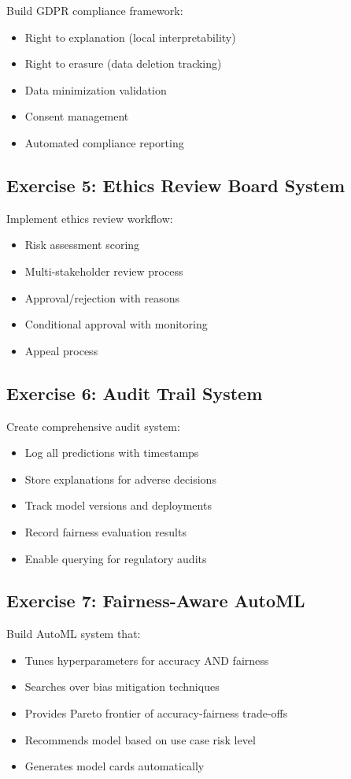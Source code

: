 Build GDPR compliance framework:
\begin{itemize}
    \item Right to explanation (local interpretability)
    \item Right to erasure (data deletion tracking)
    \item Data minimization validation
    \item Consent management
    \item Automated compliance reporting
\end{itemize}

\subsection{Exercise 5: Ethics Review Board System}

Implement ethics review workflow:
\begin{itemize}
    \item Risk assessment scoring
    \item Multi-stakeholder review process
    \item Approval/rejection with reasons
    \item Conditional approval with monitoring
    \item Appeal process
\end{itemize}

\subsection{Exercise 6: Audit Trail System}

Create comprehensive audit system:
\begin{itemize}
    \item Log all predictions with timestamps
    \item Store explanations for adverse decisions
    \item Track model versions and deployments
    \item Record fairness evaluation results
    \item Enable querying for regulatory audits
\end{itemize}

\subsection{Exercise 7: Fairness-Aware AutoML}

Build AutoML system that:
\begin{itemize}
    \item Tunes hyperparameters for accuracy AND fairness
    \item Searches over bias mitigation techniques
    \item Provides Pareto frontier of accuracy-fairness trade-offs
    \item Recommends model based on use case risk level
    \item Generates model cards automatically
\end{itemize}

